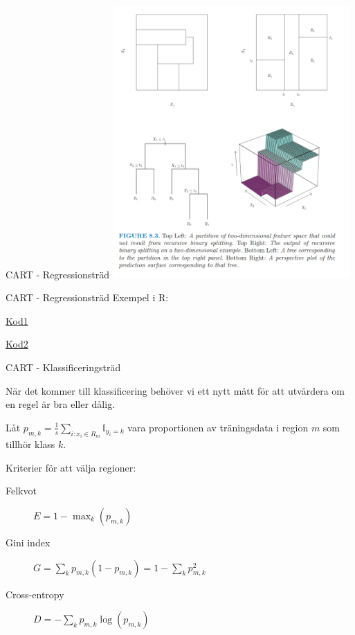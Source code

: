 \documentclass[10pt,english]{beamer}
\begin{document}
\begin{frame}{CART - Regressionsträd}
    \includegraphics[width=0.68\textwidth]{figs/reg_tree_surface.png}
\end{frame}

\begin{frame}{CART - Regressionsträd}
   Exempel i R:
   
   
   \href{https://raw.githubusercontent.com/STIMALiU/732G57_ML/master/lectures/lecture5/tree_regression_example1.R}{Kod1}
   
   \href{https://raw.githubusercontent.com/STIMALiU/732G57_ML/master/lectures/lecture5/tree_regression_example2.R}{Kod2}
   
\end{frame}


\begin{frame}{CART - Klassificeringsträd}
    
    När det kommer till klassificering behöver vi ett nytt mått för att utvärdera om en regel är bra eller dålig.

    Låt $p_{m,k} = \frac{1}{s} \sum_{i : x_i \in R_m} \mathbb{I}_{y_i = k}$ vara proportionen av träningsdata i region $m$ som tillhör klass $k$.

    Kriterier för att välja regioner:
    \begin{description}
        \item[Felkvot] $E = 1 - \max_{k} (p_{m,k})$
        \item[Gini index] $G = \sum_{k} p_{m,k} ( 1 - p_{m,k}) = 1 - \sum_{k} p_{m,k}^2$
        \item[Cross-entropy] $D = - \sum_{k} p_{m,k} \log(p_{m,k})$   
    \end{description}

\end{frame}
\end{document}
